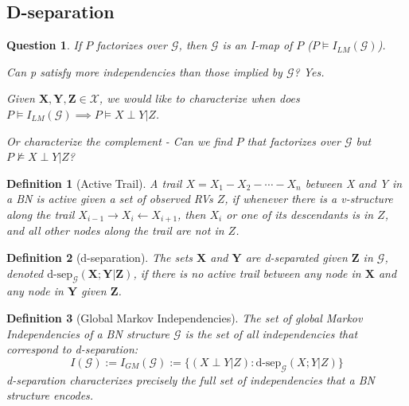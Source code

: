 \documentclass[11pt]{article}
\numberwithin{equation}{section}
\theoremstyle{boldStyle}
\newtheorem{question}{Question}[section]
\theoremstyle{boldBlueStyle}
\theoremstyle{boldPurpleStyle}
\theoremstyle{boldRedStyle}
\newtheorem{definition}{Definition}[section]
\begin{document}
\subsection{D-separation}

\begin{question}
    If $P$ factorizes over $\mathcal{G}$, then $\mathcal{G}$ is an I-map of $P$ ($P \models I_{LM}(\mathcal{G})$).

    Can p satisfy more independencies than those implied by $\mathcal{G}$? Yes. 

    Given $\textbf{X}, \textbf{Y}, \textbf{Z}\in \mathcal{X}$, we would like to characterize when does $P \models I_{LM}(\mathcal{G}) \implies P \models X \perp Y | Z$.

    Or characterize the complement - Can we find $P$ that factorizes over $\mathcal{G}$ but $P \not\models X \perp Y | Z$?

\end{question}

\begin{definition}[Active Trail]
    A trail $X = X_1 - X_2 - \cdots - X_n$ between X and Y in a BN is active given a set of observed RVs $Z$,
    if whenever there is a v-structure along the trail $X_{i-1} \rightarrow X_{i} \leftarrow X_{i+1}$, then $X_{i}$ or one of its descendants is in $Z$, 
    and all other nodes along the trail are not in $Z$.
\end{definition}

\begin{definition}[d-separation]
    The sets $\textbf{X}$ and $\textbf{Y}$ are d-separated given $\textbf{Z}$ in $\mathcal{G}$, denoted $\text{d-sep}_{\mathcal{G}}(\textbf{X};\textbf{Y} | \textbf{Z})$,
    if there is no active trail between any node in $\textbf{X}$ and any node in $\textbf{Y}$ given $\textbf{Z}$.
\end{definition}

\begin{definition}[Global Markov Independencies]
    The set of global Markov Independencies of a BN structure $\mathcal{G}$ is the set of all independencies that correspond to d-separation:
    \begin{equation*}
        I(\mathcal{G}) := I_{GM}(\mathcal{G}) := \{ (X \perp Y | Z) : \text{d-sep}_{\mathcal{G}}(X;Y | Z) \}
    \end{equation*}
    d-separation characterizes precisely the full set of independencies that a BN structure encodes.
\end{definition}
\end{document}
